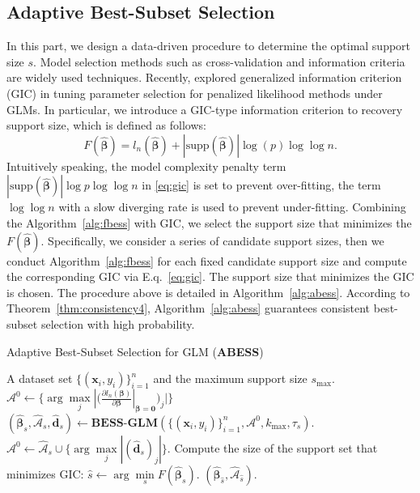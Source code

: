 \subsection{Adaptive Best-Subset Selection}
In this part, we design a data-driven procedure to determine the optimal support size $s$. Model selection methods such as cross-validation and information criteria are widely used techniques. Recently, \citet{fan2013tuning} explored generalized information criterion (GIC) in tuning parameter selection for penalized likelihood methods under GLMs. In particular, we introduce a GIC-type information criterion to recovery support size, which is defined as follows:
\begin{equation}\label{eq:gic}
F(\hat{\boldsymbol \beta}) = l_n( \hat{\boldsymbol \beta} ) + |\text{supp}(\hat{\boldsymbol \beta})| \log(p) \log\log n.
\end{equation}
Intuitively speaking, the model complexity penalty term $|\text{supp}(\hat{\boldsymbol \beta})| \log p \log\log n$ in \eqref{eq:gic} is set to prevent over-fitting, the term $\log\log n$ with a slow diverging rate is used to prevent under-fitting. Combining the Algorithm~\ref{alg:fbess} with GIC, we select the support size that minimizes the $F(\hat{\boldsymbol{\beta}})$. Specifically, we consider a series of candidate support sizes, then we conduct Algorithm~\ref{alg:fbess} for each fixed candidate support size and compute the corresponding GIC via E.q.~\eqref{eq:gic}. The support size that minimizes the GIC is chosen. The procedure above is detailed in Algorithm~\ref{alg:abess}. According to Theorem~\ref{thm:consistency4}, Algorithm~\ref{alg:abess} guarantees consistent best-subset selection with high probability.
\begin{algorithm}[htbp]
\caption{Adaptive Best-Subset Selection for GLM (\textbf{ABESS})}
\label{alg:abess}
\begin{algorithmic}[1]
\REQUIRE A dataset set $\{(\boldsymbol{x}_i, y_i)\}^{n}_{i=1}$ and the maximum support size $s_{\max}$.
\STATE $\mathcal{A}^0 \leftarrow \{ \arg\max\limits_j | (\frac{\partial l_n( \boldsymbol \beta )}{\partial \boldsymbol \beta} |_{\boldsymbol \beta = {\boldsymbol 0} })_j | \}$
\STATE $(\hat{\boldsymbol \beta}_{s}, \hat{\mathcal{A}}_{s}, \hat{\boldsymbol{d}}_s) \leftarrow \textbf{BESS-GLM}\left( \{(\boldsymbol{x}_i, y_i)\}^{n}_{i=1}, \mathcal{A}^0, k_{\max}, \tau_s \right)$.
\STATE $\mathcal{A}^0 \leftarrow \hat{\mathcal{A}}_{s} \cup \{ \arg\max\limits_j|(\hat{\boldsymbol{d}}_s)_j| \}$.
\ENDFOR
\STATE Compute the size of the support set that minimizes GIC: $\hat{s} \leftarrow \arg\min\limits_s F(\hat{\boldsymbol \beta}_s)$.
\ENSURE $(\hat{\boldsymbol \beta}_{\hat{s}}, \hat{\mathcal{A}}_{\hat{s}} )$.
\end{algorithmic}
\end{algorithm}

